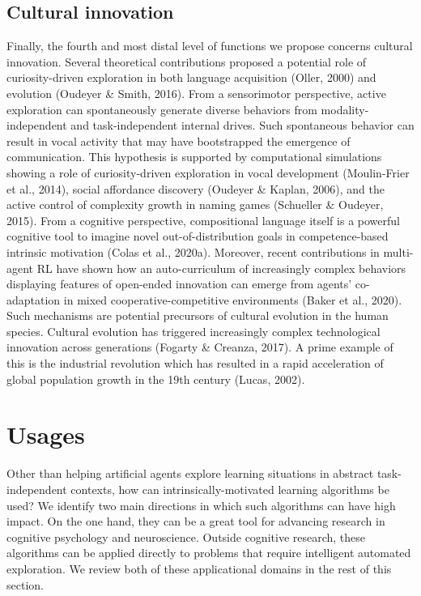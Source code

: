 \subsection{Cultural innovation} Finally, the fourth and most distal level of functions we propose concerns cultural innovation. Several theoretical contributions proposed a potential role of curiosity-driven exploration in both language acquisition (Oller, 2000) and evolution (Oudeyer \& Smith, 2016). From a sensorimotor perspective, active exploration can spontaneously generate diverse behaviors from modality-independent and task-independent internal drives. Such spontaneous behavior can result in vocal activity that may have bootstrapped the emergence of communication. This hypothesis is supported by computational simulations showing a role of curiosity-driven exploration in vocal development (Moulin-Frier et al., 2014), social affordance discovery (Oudeyer \& Kaplan, 2006), and the active control of complexity growth in naming games (Schueller \& Oudeyer, 2015). From a cognitive perspective, compositional language itself is a powerful cognitive tool to imagine novel out-of-distribution goals in competence-based intrinsic motivation (Colas et al., 2020a).  Moreover, recent contributions in multi-agent RL have shown how an auto-curriculum of increasingly complex behaviors displaying features of open-ended innovation can emerge from agents’ co-adaptation in mixed cooperative-competitive environments (Baker et al., 2020). Such mechanisms are potential precursors of cultural evolution in the human species. Cultural evolution has triggered increasingly complex technological innovation across generations (Fogarty \& Creanza, 2017). A prime example of this is the industrial revolution which has resulted in a rapid acceleration of global population growth in the 19th century (Lucas, 2002).

\section{Usages}
Other than helping artificial agents explore learning situations in abstract task-independent contexts, how can intrinsically-motivated learning algorithms be used? We identify two main directions in which such algorithms can have high impact. On the one hand, they can be a great tool for advancing research in cognitive psychology and neuroscience. Outside cognitive research, these algorithms can be applied directly to problems that require intelligent automated exploration. We review both of these applicational domains in the rest of this section.
    

